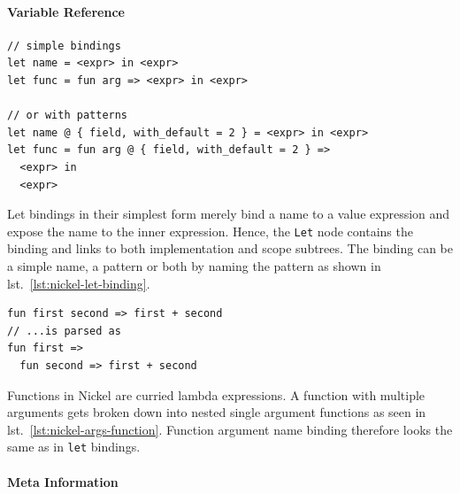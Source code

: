 \documentclass[
  a4paper,
  bibtex,
  english,
  nomenclature]{kthlatex/kththesis/kththesis}
\begin{document}
\hypertarget{sec:variable-reference}{%
\paragraph{Variable Reference}\label{sec:variable-reference}}

\begin{codelisting}

\caption{Let bindings and functions in nickel}

\hypertarget{lst:nickel-let-binding}{%
\label{lst:nickel-let-binding}}%
\begin{verbatim}
// simple bindings
let name = <expr> in <expr>
let func = fun arg => <expr> in <expr>

// or with patterns
let name @ { field, with_default = 2 } = <expr> in <expr>
let func = fun arg @ { field, with_default = 2 } => 
  <expr> in 
  <expr>
\end{verbatim}

\end{codelisting}

Let bindings in their simplest form merely bind a name to a value
expression and expose the name to the inner expression. Hence, the
\texttt{Let} node contains the binding and links to both implementation
and scope subtrees. The binding can be a simple name, a pattern or both
by naming the pattern as shown in lst.~\ref{lst:nickel-let-binding}.

\begin{codelisting}

\caption{Parsed representation of functions with multiple arguments}

\hypertarget{lst:nickel-args-function}{%
\label{lst:nickel-args-function}}%
\begin{verbatim}
fun first second => first + second
// ...is parsed as
fun first =>
  fun second => first + second
\end{verbatim}

\end{codelisting}

Functions in Nickel are curried lambda expressions. A function with
multiple arguments gets broken down into nested single argument
functions as seen in lst.~\ref{lst:nickel-args-function}. Function
argument name binding therefore looks the same as in \texttt{let}
bindings.

\hypertarget{sec:meta-information}{%
\paragraph{Meta Information}\label{sec:meta-information}}
\end{document}
